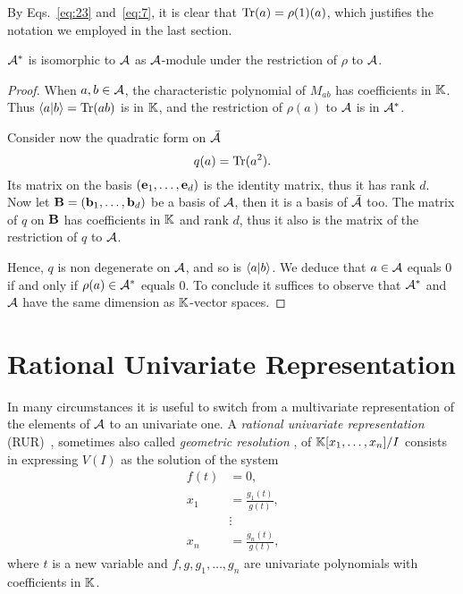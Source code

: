 By Eqs.~\eqref{eq:23} and~\eqref{eq:7}, it is clear that
$\operatorname{Tr}(a)=\rho(1)(a)$, which justifies the notation we employed in the
last section. 

\begin{theorem}
  $\mathcal{A}^\ast$ is isomorphic to $\mathcal{A}$ as
  $\mathcal{A}$-module under the restriction of $\rho$ to $\mathcal{A}$.
\end{theorem}
\begin{proof}
  When $a,b\in\mathcal{A}$, the characteristic polynomial of $M_{ab}$
  has coefficients in $\mathbb{K}$. Thus $\left\langle a \middle| b \right\rangle=\operatorname{Tr}(ab)$ is in $\mathbb{K}$,
  and the restriction of $\rho(a)$ to $\mathcal{A}$ is in
  $\mathcal{A}^\ast$.

  Consider now the quadratic form on $\bar{\mathcal{A}}$
  \begin{equation}
    \label{eq:113}
    q(a) = \operatorname{Tr}(a^2)
    \text{.}
  \end{equation}
  Its matrix on the basis $(\mathbf{e}_1,\ldots,\mathbf{e}_d)$ is the
  identity matrix, thus it has rank $d$. Now let
  $\mathbf{B}=(\mathbf{b}_1,\ldots,\mathbf{b}_d)$ be a basis of
  $\mathcal{A}$, then it is a basis of $\bar{\mathcal{A}}$ too. The
  matrix of $q$ on $\mathbf{B}$ has coefficients in $\mathbb{K}$ and rank $d$,
  thus it also is the matrix of the restriction of $q$ to $\mathcal{A}$.

  Hence, $q$ is non degenerate on $\mathcal{A}$, and so is
  $\left\langle a \middle| b \right\rangle$. We deduce that $a\in\mathcal{A}$ equals $0$ if and
  only if $\rho(a)\in\mathcal{A}^\ast$ equals $0$. To conclude it
  suffices to observe that $\mathcal{A}^\ast$ and $\mathcal{A}$ have the
  same dimension as $\mathbb{K}$-vector spaces.
\end{proof}


\section{Rational Univariate Representation}
\label{sec:rati-univ-repr}
  In many
circumstances it is useful to switch from a multivariate
representation of the elements of $\mathcal{A}$ to an univariate one. A
\emph{rational univariate representation} (RUR)~\cite{rouiller99},
sometimes also called \emph{geometric resolution}
\cite{giusti+lecerf+salvy01}, of $\mathbb{K}[x_1,\ldots,x_n]/I$ consists in
expressing $V(I)$ as the solution of the system
\begin{equation}
  \label{eq:22}
  \begin{aligned}
    f(t) &= 0\text{,}\\
    x_1 &= \frac{g_1(t)}{g(t)}\text{,}\\
    &\vdots\\
    x_n &= \frac{g_n(t)}{g(t)}\text{,}    
  \end{aligned}
\end{equation}
where $t$ is a new variable and $f,g,g_1,\ldots,g_n$ are univariate
polynomials with coefficients in $\mathbb{K}$.


